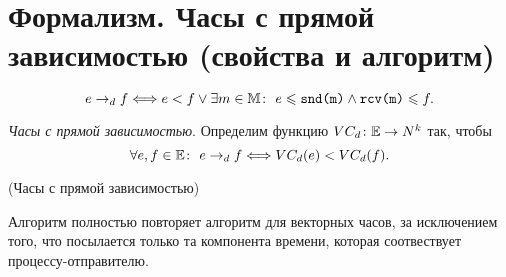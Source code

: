 \section{Формализм. Часы с прямой зависимостью (свойства и алгоритм)}

\begin{definition}
    \[
        e \to_d f \Longleftrightarrow e < f \vee \exists m \in \mathbb{M} \colon~ e \leqslant \texttt{snd(m)}
        \wedge \texttt{rcv(m)} \leqslant f
    .\]
\end{definition}

\begin{definition}
    \textit{Часы с прямой зависимостью}. Определим функцию $VC_d \colon \mathbb{E} \to N^k$
    так, чтобы
    \[
        \forall e, f \in \mathbb{E}\colon~ e \to_d f \Longleftrightarrow VC_d(e) < VC_d(f)
    .\]
\end{definition}

\begin{algorithm}(Часы с прямой зависимостью)

    Алгоритм полностью повторяет алгоритм для векторных часов, за исключением
    того, что посылается только та компонента времени, которая соотвествует
    процессу-отправителю.
\end{algorithm}
